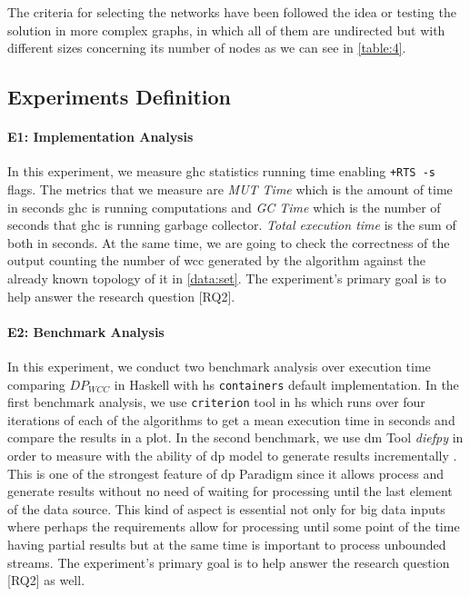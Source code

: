  The criteria for selecting the networks have been followed the idea or testing the solution in more complex graphs, in which all of them are undirected but with different sizes concerning its number of nodes as we can see in  \autoref{table:4}. 

\subsection{Experiments Definition}\label{sub:exp:def}
\paragraph{E1: Implementation Analysis}
In this experiment, we measure \acrshort{ghc} statistics running time enabling \texttt{+RTS -s} flags. The metrics that we measure are \emph{MUT Time} which is the amount of time in seconds \acrshort{ghc} is running computations and \emph{GC Time} which is the number of seconds that \acrshort{ghc} is running garbage collector. \emph{Total execution time} is the sum of both in seconds. At the same time, we are going to check the correctness of the output counting the number of \acrshort{wcc} generated by the algorithm against the already known topology of it in \autoref{data:set}. The experiment's primary goal is to help answer the research question [RQ2].

\paragraph{E2: Benchmark Analysis}
In this experiment, we conduct two benchmark analysis over execution time comparing $DP_{WCC}$ in Haskell with \acrshort{hs} \texttt{containers} default implementation. In the first benchmark analysis, we use \texttt{criterion} \cite{criterion} tool in \acrshort{hs} which runs over four iterations of each of the algorithms to get a mean execution time in seconds and compare the results in a plot. In the second benchmark, we use \acrfull{dm} Tool \emph{diefpy} \cite{diefpy} in order to measure with the ability of \acrshort{dp} model to generate results incrementally \cite{diefpaper}. This is one of the strongest feature of \acrshort{dp} Paradigm since it allows process and generate results without no need of waiting for processing until the last element of the data source. This kind of aspect is essential not only for big data inputs where perhaps the requirements allow for processing until some point of the time having partial results but at the same time is important to process unbounded streams. The experiment's primary goal is to help answer the research question [RQ2] as well.

